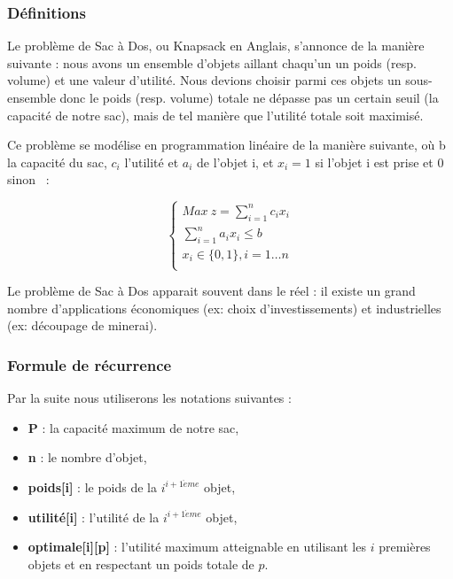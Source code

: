 \subsubsection{Définitions}

Le problème de Sac à Dos, ou \og Knapsack \fg{} en Anglais, s'annonce de la manière suivante : nous avons un ensemble d'objets aillant chaqu'un un poids (resp. volume) et une valeur d'utilité. Nous devions choisir parmi ces objets un sous-ensemble donc le poids (resp. volume) totale ne dépasse pas un certain seuil (la capacité de notre sac), mais de tel manière que l'utilité totale soit maximisé.

Ce problème se modélise en programmation linéaire de la
manière suivante, où b la capacité du sac, $c_i$ l'utilité et $a_i$ de l'objet i, et $x_i = 1$ si l'objet i est prise et $0$ sinon ~:

\begin{equation}
\begin{cases}
Max~z=\sum_{i=1}^nc_ix_i \\
\sum_{i=1}^na_ix_i \leq b \\
x_i \in\{0, 1\}, i=1\dots n\\
\end{cases}
\end{equation}

Le problème de Sac à Dos apparait souvent dans le réel : il existe un grand nombre d'applications économiques (ex: choix d'investissements) et industrielles (ex: découpage de minerai).

\subsubsection{Formule de récurrence}

Par la suite nous utiliserons les notations suivantes :

\begin{itemize}
\item \textbf{P} : la capacité maximum de notre sac,
\item \textbf{n} : le nombre d'objet,
\item \textbf{poids[i]} : le poids de la $i^{i+1\grave{e}me}$ objet,
\item \textbf{utilité[i]} : l'utilité de la $i^{i+1\grave{e}me}$ objet,
\item \textbf{optimale[i][p]} : l'utilité maximum atteignable en utilisant les $i$ premières objets et en respectant un poids totale de $p$.
\end{itemize} 

